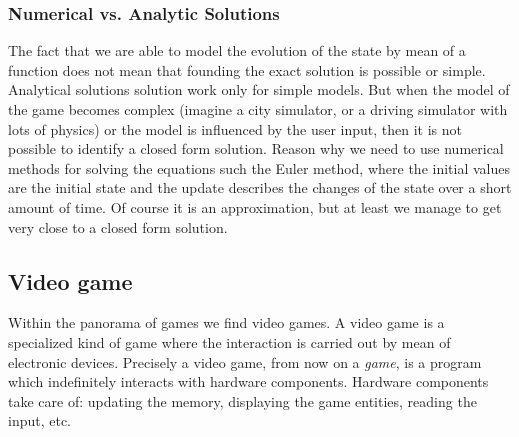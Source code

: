 \documentclass[10pt,a4paper]{article}
\begin{document}
\subsubsection{Numerical vs. Analytic Solutions}
The fact that we are able to model the evolution of the state by mean of a function does not mean that founding the exact solution is possible or simple. Analytical solutions solution work only for simple models. But when the model of the game becomes complex (imagine a city simulator, or a driving simulator with lots of physics) or the model is influenced by the user input, then it is not possible to identify a closed form solution. Reason why we need to use numerical methods for solving the equations such the Euler method, where the initial values are the initial state and the update describes the changes of the state over a short amount of time. Of course it is an approximation, but at least we manage to get very close to a closed form solution.

\subsection{Video game}
Within the panorama of games we find video games. A video game is a specialized kind of game where the interaction is carried out by mean of electronic devices. Precisely a video game, from now on a \textit{game}, is a program which indefinitely interacts with hardware components. Hardware components take care of: updating the memory, displaying the game entities, reading the input, etc.
\end{document}

